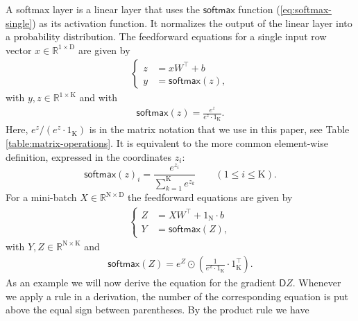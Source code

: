 \documentclass[twoside,11pt]{article}
\newcommand{\const}[1]{\ensuremath{\mathrm{#1}}} %
\newcommand{\func}[1]{\ensuremath{\textsf{#1}}} %
\newcommand{\Gradient}{\textsf{D}}
\newcommand{\Reals}{\mathbb{R}}
\begin{document}
A softmax layer is a linear layer that uses the \func{softmax} function (\ref{eq:softmax-single}) as its activation function. It normalizes the output of the linear layer into a probability distribution. The feedforward equations for a single input row vector $x \in \Reals^{1 \times \const{D}}$ are given by
\begin{align}
\begin{cases} \label{eq:softmax-layer-feedforward}
    z &= x W^\top + b \\
    y &= \func{softmax}(z),
\end{cases}
\end{align}
with $y, z \in \Reals^{1 \times \const{K}}$ and with
\begin{align} \label{eq:softmax-single}
    \func{softmax}(z) = \frac{e^z}{e^z \cdot 1_\const{K}}.
\end{align}
Here, $e^z / (e^z \cdot 1_\const{K})$ is in the matrix notation that we use in this paper, see Table \ref{table:matrix-operations}.
It is equivalent to the more common element-wise definition, expressed in the coordinates $z_i$:
\[
\func{softmax}(z)_i = \frac{e^{z_i}}{\sum_{k=1}^\const{K} e^{z_k}} \qquad (1 \leq i \leq \const{K}).
\]
For a mini-batch $X \in \Reals^{\const{N} \times \const{D}}$ the feedforward equations are given by
\begin{align}
\begin{cases}
    Z &= X W^\top + 1_\const{N} \cdot b \\
    Y &= \func{softmax}(Z),
\end{cases}
\end{align}
with $Y, Z \in \Reals^{\const{N} \times \const{K}}$ and
\begin{align}
\label{eq:softmax-multiple}
    \func{softmax}(Z) = e^Z \odot \left( \frac{1}{e^Z \cdot 1_\const{K}}  \cdot 1_\const{K}^\top \right).
\end{align}
As an example we will now derive the equation for the gradient $\Gradient Z$.
Whenever we apply a rule in a derivation, the number of the corresponding equation is put above the
equal sign between parentheses. By the product rule we have
\end{document}
